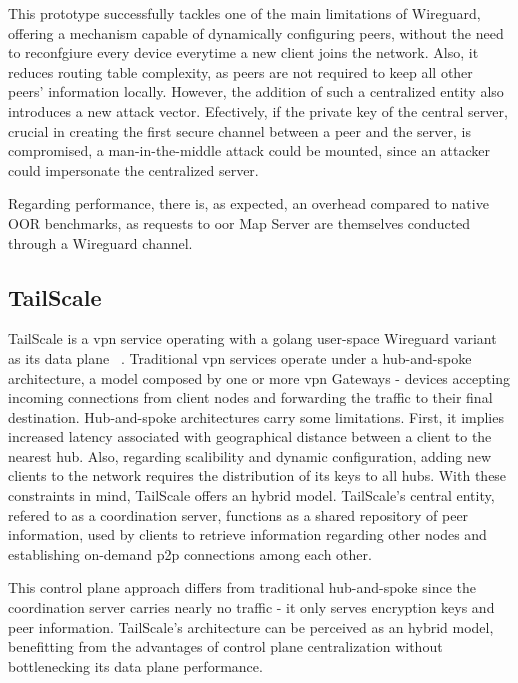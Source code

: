 \documentclass[11pt,twoside,a4paper]{report}
\begin{document}
This prototype successfully tackles one of the main limitations of Wireguard, offering a mechanism capable of dynamically configuring peers, without the need to reconfgiure every device everytime a new client joins the network. Also, it reduces routing table complexity, as peers are not required to keep all other peers' information locally. However, the addition of such a centralized entity also introduces a new attack vector. Efectively, if the private key of the central server, crucial in creating the first secure channel between a peer and the server, is compromised, a man-in-the-middle attack could be mounted, since an attacker could impersonate the centralized server.

Regarding performance, there is, as expected, an overhead compared to native OOR benchmarks, as requests to \acrshort{oor} Map Server are themselves conducted through a Wireguard channel.

\subsection{TailScale}

TailScale is a \acrshort{vpn} service operating with a golang user-space Wireguard variant as its data plane ~\cite{tailscale2020online}. Traditional \acrshort{vpn} services operate under a hub-and-spoke architecture, a model composed by one or more \acrshort{vpn} Gateways - devices accepting incoming connections from client nodes and forwarding the traffic to their final destination. Hub-and-spoke architectures carry some limitations. First, it implies increased latency associated with geographical distance between a client to the nearest hub. Also, regarding scalibility and dynamic configuration, adding new clients to the network requires the distribution of its keys to all hubs. With these constraints in mind, TailScale offers an hybrid model. TailScale's central entity, refered to as a coordination server, functions as a shared repository of peer information, used by clients to retrieve information regarding other nodes and establishing on-demand \acrshort{p2p} connections among each other.

This control plane approach differs from traditional hub-and-spoke since the coordination server carries nearly no traffic - it only serves encryption keys and peer information. TailScale's architecture can be perceived as an hybrid model, benefitting from the advantages of control plane centralization without bottlenecking its data plane performance.
\end{document}
